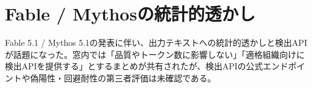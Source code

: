 \section{Fable / Mythosの統計的透かし}
Fable 5.1 / Mythos 5.1の発表に伴い、出力テキストへの統計的透かしと検出APIが話題になった。窓内では「品質やトークン数に影響しない」「適格組織向けに検出APIを提供する」とするまとめが共有されたが、検出APIの公式エンドポイントや偽陽性・回避耐性の第三者評価は未確認である。
